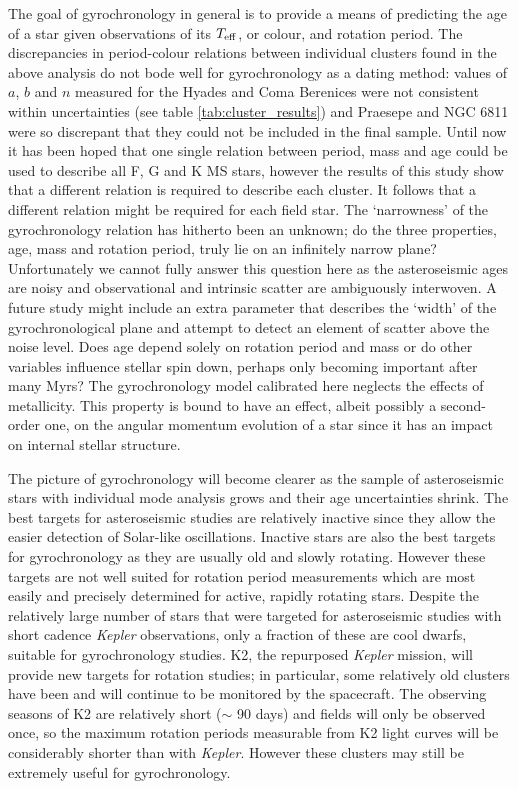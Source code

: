 \documentclass[11pt,preprint]{aastex}
\newcommand{\teff}{$T_{\rm{eff}}$}
\begin{document}
The goal of gyrochronology in general is to provide a means of predicting the
age of a star given observations of its \teff, or colour, and rotation period.
The discrepancies in period-colour relations between individual clusters found
in the above analysis do not bode well for gyrochronology as a dating method:
values of $a$, $b$ and $n$ measured for the Hyades and Coma Berenices were not
consistent within uncertainties (see table \ref{tab:cluster_results}) and
Praesepe and NGC 6811 were so discrepant that they could not be included in
the final sample.
Until now it has been hoped that one single relation between period, mass and
age could be used to describe all F, G and K MS stars, however the results of
this study show that a different relation is required to describe each
cluster.
It follows that a different relation might be required for each field star.
The `narrowness' of the gyrochronology relation has hitherto been an unknown;
do the three properties, age, mass and rotation period, truly lie on an
infinitely narrow plane?
Unfortunately we cannot fully answer this question here as the asteroseismic
ages are noisy and observational and intrinsic scatter are ambiguously
interwoven.
A future study might include an extra parameter that describes the `width' of
the gyrochronological plane and attempt to detect an element of scatter above
the noise level.
Does age depend solely on rotation period and mass or do other variables
influence stellar spin down, perhaps only becoming important after many Myrs?
The gyrochronology model calibrated here neglects the effects of metallicity.
This property is bound to have an effect, albeit possibly a second-order one,
on the angular momentum evolution of a star since it has an impact on internal
stellar structure.

The picture of gyrochronology will become clearer as the sample of
asteroseismic stars with individual mode analysis grows and their age
uncertainties shrink.
The best targets for asteroseismic studies are relatively inactive since they
allow the easier detection of Solar-like oscillations.
Inactive stars are also the best targets for gyrochronology as they are
usually old and slowly rotating.
However these targets are not well suited for
rotation period measurements which are most easily and precisely determined
for active, rapidly rotating stars.
Despite the relatively large number of stars that were targeted for
asteroseismic studies with short cadence {\it Kepler} observations, only
a fraction of these are cool dwarfs, suitable for gyrochronology studies.
K2, the repurposed {\it Kepler} mission, will provide new targets for rotation
studies; in particular, some relatively old clusters have been and will
continue to be monitored by the spacecraft.
The observing seasons of K2 are relatively short ($\sim$ 90 days) and fields
will only be observed once, so the maximum rotation periods measurable from
K2 light curves will be considerably shorter than with {\it Kepler}.
However these clusters may still be extremely useful for gyrochronology.
\end{document}
